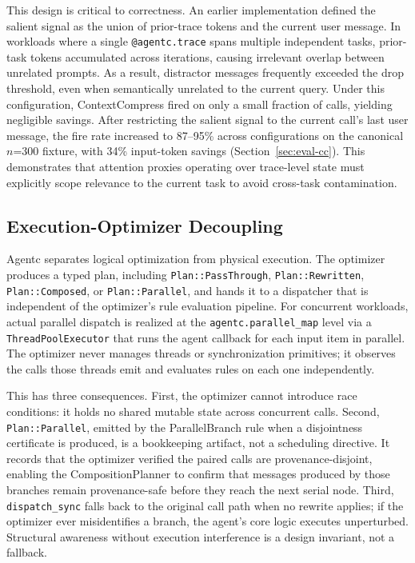 This design is critical to correctness. An earlier implementation defined the salient
signal as the union of prior-trace tokens and the current user message. In workloads
where a single \texttt{@agentc.trace} spans multiple independent tasks, prior-task
tokens accumulated across iterations, causing irrelevant overlap between unrelated
prompts. As a result, distractor messages frequently exceeded the drop threshold, even
when semantically unrelated to the current query. Under this configuration,
ContextCompress fired on only a small fraction of calls, yielding negligible savings.
After restricting the salient signal to the current call's last user message, the fire
rate increased to 87--95\% across configurations on the canonical $n$=300 fixture,
with 34\% input-token savings (Section~\ref{sec:eval-cc}). This demonstrates that
attention proxies operating over trace-level state must explicitly scope relevance to
the current task to avoid cross-task contamination.

\subsection{Execution-Optimizer Decoupling}
\label{sec:decoupling}

Agentc separates logical optimization from physical execution. The optimizer
produces a typed plan, including \texttt{Plan::PassThrough}, \texttt{Plan::Rewritten},
\texttt{Plan::Composed}, or \texttt{Plan::Parallel}, and hands it to a
dispatcher that is independent of the optimizer's rule evaluation pipeline. For
concurrent workloads, actual parallel dispatch is realized at the
\texttt{agentc.parallel\_map} level via a \texttt{ThreadPoolExecutor} that runs
the agent callback for each input item in parallel. The optimizer never manages
threads or synchronization primitives; it observes the calls those threads emit
and evaluates rules on each one independently.

This has three consequences. First, the optimizer cannot introduce race
conditions: it holds no shared mutable state across concurrent calls. Second,
\texttt{Plan::Parallel}, emitted by the ParallelBranch rule when a disjointness
certificate is produced, is a bookkeeping artifact, not a scheduling directive.
It records that the optimizer verified the paired calls are provenance-disjoint,
enabling the CompositionPlanner to confirm that messages produced by those branches
remain provenance-safe before they reach the next serial node. Third,
\texttt{dispatch\_sync} falls back to the original call path when no rewrite
applies; if the optimizer ever misidentifies a branch, the agent's core logic
executes unperturbed. Structural awareness without execution interference is a
design invariant, not a fallback.

